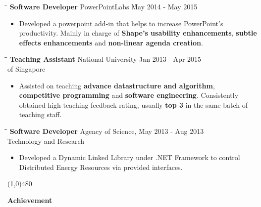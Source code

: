 \documentclass[9pt]{article}
\begin{document}

\begin{tabbing}
\hspace{2.6in}\= \hspace{2.6in}\= \kill
{\bf Software Developer} \> PowerPointLabs \`May 2014 - May 2015\
\end{tabbing}

\begin{itemize}
    \item Developed a powerpoint add-in that helps to increase PowerPoint's productivity. Mainly in charge of {\bf Shape's usability enhancements}, {\bf subtle effects enhancements} and {\bf non-linear agenda creation}.\vspace{-6pt}
\end{itemize}

\begin{tabbing}
\hspace{2.6in}\= \hspace{2.6in}\= \kill
{\bf Teaching Assistant} \> National University \`Jan 2013 - Apr 2015\\
\> of Singapore
\end{tabbing}

\begin{itemize}
    \item Assisted on teaching {\bf advance datastructure and algorithm}, {\bf competitive programming} and {\bf software engineering}. Consistently obtained high teaching feedback rating, usually {\bf top 3} in the same batch of teaching staff.
\end{itemize}

\begin{tabbing}
\hspace{2.6in} \= \hspace{2.6in}\= \kill
{\bf Software Developer} \> Agency of Science,  \`May 2013 - Aug 2013\\
\> Technology and Research
\end{tabbing}

\begin{itemize}
  \item Developed a Dynamic Linked Library under .NET Framework to control Distributed Energy Resources via provided interfaces.
\end{itemize}

\centerline{\line(1,0){480}}

\medskip

\centerline {\Large \bf Achievement}
\end{document}
